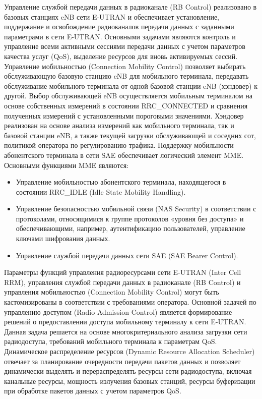 Управление службой передачи данных в радиоканале (RB Control) реализовано в базовых станциях eNB сети E-UTRAN и обеспечивает установление, поддержание и освобождение радиоканалов передачи данных с заданными параметрами в сети E-UTRAN. Основными задачами являются контроль и управление всеми активными сессиями передачи данных с учетом параметров качества услуг (QoS), выделение ресурсов для вновь активируемых сессий.
Управление мобильностью (Connection Mobility Control) позволяет выбирать обслуживающую базовую станцию eNB для мобильного терминала, передавать обслуживание мобильного терминала от одной базовой станции eNB (хэндовер) к другой. Выбор обслуживающей eNB осуществляется мобильным терминалом на основе собственных измерений в состоянии RRC\_CONNECTED и сравнения полученных измерений с установленными пороговыми значениями. Хэндовер реализован на основе анализа измерений как мобильного терминала, так и базовой станции eNB, а также текущей загрузки обслуживающей и соседних сот, политикой оператора по регулированию трафика.
Поддержку мобильности абонентского терминала в сети SAE обеспечивает логический элемент MME. Основными функциями MME являются:
\begin{itemize}
  \item Управление мобильностью абонентского терминала, находящегося в состоянии RRC\_IDLE (Idle State Mobility Handling).
  \item Управление безопасностью мобильной связи (NAS Security) в соответствии с протоколами, относящимися к группе протоколов «уровня без доступа» и обеспечивающими, например, аутентификацию пользователей, управление ключами шифрования данных.
  \item Управление службой передачи данных сети SAE (SAE Bearer Control).
\end{itemize}
Параметры функций управления радиоресурсами сети E-UTRAN (Inter
Cell RRM), управления службой передачи данных в радиоканале (RB Control) и управления мобильностью (Connection Mobility Control) могут быть кастомизированы в соответствии с требованиями оператора.
Основной задачей по управлению доступом (Radio Admission Control) является формирование решений о предоставлении доступа мобильному терминалу к сети E-UTRAN. Данная задача решается на основе многокритериального анализа загрузки сети радиодоступа, требований мобильного терминала к параметрам QoS.
Динамическое распределение ресурсов (Dynamic Resource Allocation Scheduler) отвечает за планирование очередности передачи пакетов данных и позволяет динамически выделять и перераспределять ресурсы сети радиодоступа, включая канальные ресурсы, мощность излучения базовых станций, ресурсы буферизации при обработке пакетов данных с учетом параметров QoS.
